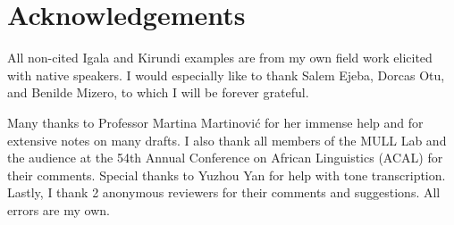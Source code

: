 \documentclass[output=paper,colorlinks,citecolor=brown,
]{langscibook}
\begin{document}
\section*{Acknowledgements}

All non-cited Igala and Kirundi examples are from my own field work elicited with native speakers. I would especially like to thank Salem Ejeba, Dorcas Otu, and Benilde Mizero, to which I will be forever grateful.

Many thanks to Professor Martina Martinović for her immense help and for extensive notes on many drafts. I also thank all members of the MULL Lab and the audience at the 54th Annual Conference on African Linguistics (ACAL) for their comments. Special thanks to Yuzhou Yan for help with tone transcription. Lastly, I thank 2 anonymous reviewers for their comments and suggestions. All errors are my own.

%
%
%

\sloppy %
\printbibliography[heading=subbibliography,notkeyword=this]
\end{document}
